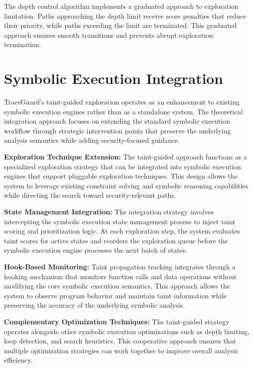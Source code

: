 The depth control algorithm implements a graduated approach to exploration limitation. Paths approaching the depth limit receive score penalties that reduce their priority, while paths exceeding the limit are terminated. This graduated approach ensures smooth transitions and prevents abrupt exploration termination.

\section{Symbolic Execution Integration}

TraceGuard's taint-guided exploration operates as an enhancement to existing symbolic execution engines rather than as a standalone system. The theoretical integration approach focuses on extending the standard symbolic execution workflow through strategic intervention points that preserve the underlying analysis semantics while adding security-focused guidance.

\textbf{Exploration Technique Extension:} The taint-guided approach functions as a specialized exploration strategy that can be integrated into symbolic execution engines that support pluggable exploration techniques. This design allows the system to leverage existing constraint solving and symbolic reasoning capabilities while directing the search toward security-relevant paths.

\textbf{State Management Integration:} The integration strategy involves intercepting the symbolic execution state management process to inject taint scoring and prioritization logic. At each exploration step, the system evaluates taint scores for active states and reorders the exploration queue before the symbolic execution engine processes the next batch of states.

\textbf{Hook-Based Monitoring:} Taint propagation tracking integrates through a hooking mechanism that monitors function calls and data operations without modifying the core symbolic execution semantics. This approach allows the system to observe program behavior and maintain taint information while preserving the accuracy of the underlying symbolic analysis.

\textbf{Complementary Optimization Techniques:} The taint-guided strategy operates alongside other symbolic execution optimizations such as depth limiting, loop detection, and search heuristics. This cooperative approach ensures that multiple optimization strategies can work together to improve overall analysis efficiency.

